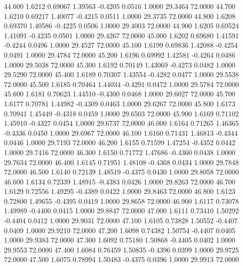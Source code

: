   44.600   1.6212   0.69067   1.39563  -0.4205   0.0516   1.0000  29.3464  72.0000
  44.700   1.6210   0.69217   1.40077  -0.4215   0.0511   1.0000  29.3735  72.0000
  44.800   1.6208   0.69370   1.40586  -0.4225   0.0506   1.0000  29.4003  72.0000
  44.900   1.6205   0.69524   1.41091  -0.4235   0.0501   1.0000  29.4267  72.0000
  45.000   1.6202   0.69680   1.41591  -0.4244   0.0496   1.0000  29.4527  72.0000
  45.100   1.6199   0.69836   1.42088  -0.4254   0.0491   1.0000  29.4784  72.0000
  45.200   1.6196   0.69992   1.42581  -0.4264   0.0486   1.0000  29.5038  72.0000
  45.300   1.6192   0.70149   1.43069  -0.4273   0.0482   1.0000  29.5290  72.0000
  45.400   1.6189   0.70307   1.43554  -0.4282   0.0477   1.0000  29.5538  72.0000
  45.500   1.6185   0.70464   1.44034  -0.4291   0.0472   1.0000  29.5784  72.0000
  45.600   1.6181   0.70623   1.44510  -0.4300   0.0468   1.0000  29.6027  72.0000
  45.700   1.6177   0.70781   1.44982  -0.4309   0.0463   1.0000  29.6267  72.0000
  45.800   1.6173   0.70941   1.45449  -0.4318   0.0459   1.0000  29.6503  72.0000
  45.900   1.6169   0.71102   1.45910  -0.4327   0.0454   1.0000  29.6737  72.0000
  46.000   1.6164   0.71265   1.46365  -0.4336   0.0450   1.0000  29.6967  72.0000
  46.100   1.6160   0.71431   1.46813  -0.4344   0.0446   1.0000  29.7193  72.0000
  46.200   1.6155   0.71599   1.47254  -0.4352   0.0442   1.0000  29.7416  72.0000
  46.300   1.6150   0.71772   1.47686  -0.4360   0.0438   1.0000  29.7634  72.0000
  46.400   1.6145   0.71951   1.48108  -0.4368   0.0434   1.0000  29.7848  72.0000
  46.500   1.6140   0.72139   1.48519  -0.4375   0.0430   1.0000  29.8058  72.0000
  46.600   1.6134   0.72339   1.48915  -0.4383   0.0426   1.0000  29.8263  72.0000
  46.700   1.6129   0.72556   1.49295  -0.4389   0.0422   1.0000  29.8463  72.0000
  46.800   1.6123   0.72800   1.49655  -0.4395   0.0419   1.0000  29.8658  72.0000
  46.900   1.6117   0.73078   1.49989  -0.4400   0.0415   1.0000  29.8847  72.0000
  47.000   1.6111   0.73410   1.50292  -0.4404   0.0412   1.0000  29.9031  72.0000
  47.100   1.6105   0.73828   1.50552  -0.4407   0.0409   1.0000  29.9210  72.0000
  47.200   1.6098   0.74382   1.50754  -0.4407   0.0405   1.0000  29.9383  72.0000
  47.300   1.6092   0.75180   1.50868  -0.4405   0.0402   1.0000  29.9553  72.0000
  47.400   1.6084   0.76459   1.50835  -0.4396   0.0399   1.0000  29.9725  72.0000
  47.500   1.6075   0.78994   1.50483  -0.4375   0.0396   1.0000  29.9913  72.0000
